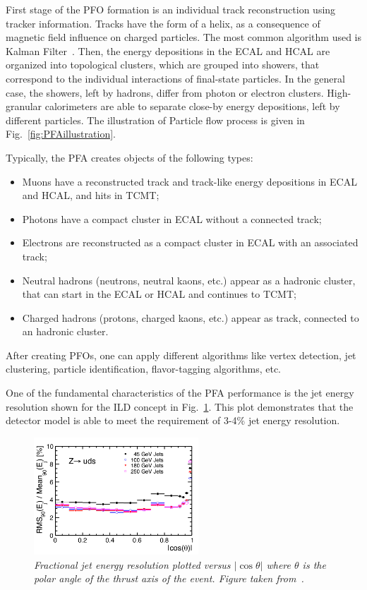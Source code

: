 First stage of the PFO formation is an individual track reconstruction using tracker information. Tracks have the form of a helix, as a consequence of magnetic field influence on charged particles.  The most common algorithm used is Kalman Filter~\cite{bib:KalTest}.
Then, the energy depositions in the ECAL and HCAL are organized into topological clusters, which are grouped into showers, that correspond to the individual interactions of final-state particles. 
In the general case, the showers, left by hadrons, differ from photon or electron clusters. %
High-granular calorimeters are able to separate close-by energy depositions, left by different particles. The illustration of Particle flow process is given in Fig.~\ref{fig:PFAillustration}.

Typically, the PFA creates objects of the following types:
\begin{itemize}
\item Muons have a reconstructed track and track-like energy depositions in ECAL and HCAL, and hits in TCMT;
\item Photons have a compact cluster in ECAL without a connected track;
\item Electrons are reconstructed as a compact cluster in ECAL with an associated track;

\item Neutral hadrons (neutrons, neutral kaons, etc.) appear as a hadronic cluster, that can start in the ECAL or HCAL and continues to TCMT;
\item Charged hadrons (protons, charged kaons, etc.) appear as track, connected to an hadronic cluster.
\end{itemize}

After creating PFOs, one can apply different algorithms like vertex detection, jet clustering, particle identification, flavor-tagging algorithms, etc.

One of the fundamental characteristics of the PFA performance is the jet energy resolution shown for the ILD concept in Fig.~\ref{fig:ILCjetrms}. This plot demonstrates that the detector model is able to meet the requirement of 3-4\% jet energy resolution.

\begin{figure}[H]
{\centering
    \includegraphics[width=0.55\textwidth]{graphics/ILCjetrms.png}
    \caption{\sl Fractional jet energy resolution plotted versus $|\cos\theta|$ where $\theta$ is the polar angle of the thrust axis of the event. Figure taken from~\cite{bib:ILC}.}
    \label{fig:ILCjetrms}
  }
\end{figure}


